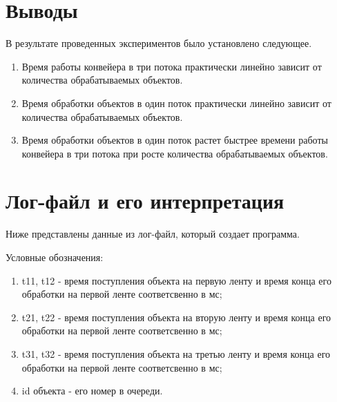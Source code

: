\documentclass[a4paper,14pt]{report}
\begin{document}
\begin{figure}[!h]
\end{figure}

\newpage

\section*{Выводы}

В результате проведенных экспериментов было установлено следующее.
\begin{enumerate}
	\item Время работы конвейера в три потока практически линейно зависит от количества обрабатываемых объектов.
	\item Время обработки объектов в один поток практически линейно зависит от количества обрабатываемых объектов.
	\item Время обработки объектов в один поток растет быстрее времени работы конвейера в три потока при росте количества обрабатываемых объектов.
\end{enumerate}

\section*{Лог-файл и его интерпретация}

Ниже представлены данные из лог-файл, который создает программа.

Условные обозначения:
\begin{enumerate}
	\item t11, t12 - время поступления объекта на первую ленту и время конца его обработки на первой ленте соответсвенно в мс;
	\item t21, t22 - время поступления объекта на вторую ленту и время конца его обработки на первой ленте соответсвенно в мс;
	\item t31, t32 - время поступления объекта на третью ленту и время конца его обработки на первой ленте соответсвенно в мс;
	\item id объекта - его номер в очереди.
\end{enumerate}
\end{document}
